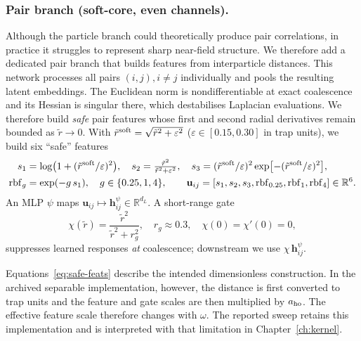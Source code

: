 \subsubsection{Pair branch (soft-core, even channels).}
Although the particle branch could theoretically produce pair correlations, in practice it struggles to represent sharp near-field structure. We therefore add a dedicated pair branch that builds features from interparticle distances.
This network processes all pairs $(i,j), i\ne j$ individually and pools the resulting latent embeddings. 
The Euclidean norm is nondifferentiable at exact coalescence and its Hessian is singular
there, which destabilises Laplacian evaluations. We therefore build \emph{safe} pair features
whose first and second radial derivatives remain bounded as $\tilde r\to 0$.
With $\tilde r^{\rm soft}=\sqrt{\tilde r^2+\varepsilon^2}$ ($\varepsilon\!\in[0.15,0.30]$ in trap units), we build six “safe” features
\begin{align}
  s_1 &= \log\!\big(1+(\tilde r^{\rm soft}/\varepsilon)^2\big),\quad
  s_2 = \tfrac{\tilde r^{2}}{\tilde r^{2}+\varepsilon^2},\quad
  s_3 = (\tilde r^{\rm soft}/\varepsilon)^{2}\exp[-(\tilde r^{\rm soft}/\varepsilon)^{2}], \notag\\
  \mathrm{rbf}_g &= \exp(-g\,s_1),\quad g\in\{0.25,1,4\},\qquad
  \mathbf u_{ij}=[s_1,s_2,s_3,\mathrm{rbf}_{0.25},\mathrm{rbf}_{1},\mathrm{rbf}_4]\in\mathbb R^{6}.
  \label{eq:safe-feats}
\end{align}
An MLP $\psi$ maps $\mathbf u_{ij}\mapsto\mathbf h^{\psi}_{ij}\in\mathbb R^{d_L}$. A short-range gate
\[
  \chi(\tilde r)=\frac{\tilde r^{2}}{\tilde r^{2}+r_g^{2}},\quad r_g\approx 0.3,\quad \chi(0)=\chi'(0)=0,
\]
suppresses learned responses \emph{at} coalescence; downstream we use
$\chi\,\mathbf h^\psi_{ij}$.

Equations~\eqref{eq:safe-feats} describe the intended dimensionless construction. In the
archived separable implementation, however, the distance is first converted to trap units
and the feature and gate scales are then multiplied by $a_{\rm ho}$. The effective feature
scale therefore changes with $\omega$. The reported sweep retains this implementation and is
interpreted with that limitation in Chapter~\ref{ch:kernel}.

